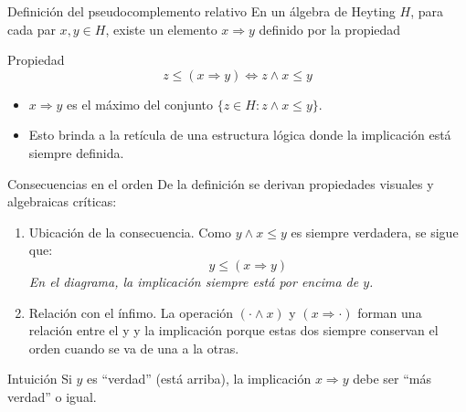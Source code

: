 \documentclass{beamer}
\begin{document}
\begin{frame}{Definición del pseudocomplemento relativo}
    En un álgebra de Heyting $H$, para cada par $x, y \in H$, existe un elemento $x \Rightarrow y$ definido por la propiedad
    
    \begin{block}{Propiedad}
        \[ z \leq (x \Rightarrow y) \iff z \wedge x \leq y \]
    \end{block}
    
    \begin{itemize}
        \item $x \Rightarrow y$ es el máximo del conjunto $\{z \in H : z \wedge x \leq y\}$.
        \item Esto brinda a la retícula de una estructura lógica donde la implicación está siempre definida.
    \end{itemize}
\end{frame}

\begin{frame}{Consecuencias en el orden}
    De la definición se derivan propiedades visuales y algebraicas críticas:
    
    \vfill
    \begin{enumerate}
        \item Ubicación de la consecuencia.
        Como $y \wedge x \leq y$ es siempre verdadera, se sigue que:
        \[ y \leq (x \Rightarrow y) \]
        \textit{En el diagrama, la implicación siempre está por encima de $y$.}
        
        \item Relación con el ínfimo.
        La operación $(\cdot \wedge x)$ y $(x \Rightarrow \cdot)$ forman una relación entre el y y la implicación porque
        estas dos siempre conservan el orden cuando se va de una a la otras.
    \end{enumerate}
    \vfill
    
    \begin{exampleblock}{Intuición}
        Si $y$ es ``verdad'' (está arriba), la implicación $x \Rightarrow y$ debe ser ``más verdad'' o igual.
    \end{exampleblock}
\end{frame}
\end{document}

